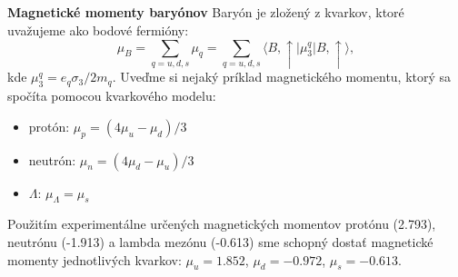 \documentclass[../../main.tex]{subfiles}
\begin{document}
\textbf{Magnetické momenty baryónov}\newline
Baryón je zložený z kvarkov, ktoré uvažujeme ako bodové fermióny: 
\begin{equation}
\mu_B = \sum_{q=u,d,s} \mu_q = \sum_{q=u,d,s} \langle B,\uparrow \vert \mu_3^q  \vert B,\uparrow \rangle,
\end{equation}
kde $\mu_3^q= e_q\sigma_3/2m_q $. Uveďme si nejaký príklad magnetického momentu, ktorý sa spočíta pomocou kvarkového modelu:
\begin{itemize}
\item protón: $\mu_p = (4\mu_u - \mu_d)/3$
\item neutrón: $\mu_n = (4\mu_d - \mu_u)/3$
\item $\Lambda$: $\mu_{\Lambda} = \mu_s$
\end{itemize}
Použitím experimentálne určených magnetických momentov protónu (2.793), neutrónu (-1.913) a lambda mezónu (-0.613) sme schopný dostať magnetické momenty jednotlivých kvarkov: $\mu_u = 1.852$, $\mu_d = -0.972$, $\mu_s = -0.613$.\newline
\end{document}
